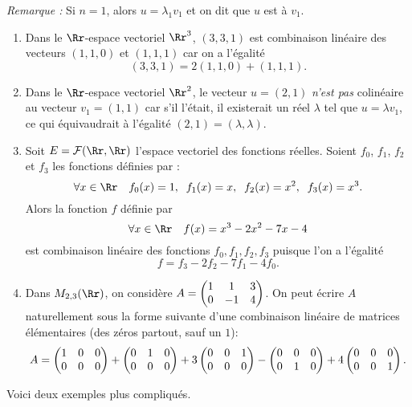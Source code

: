 \documentclass[class=report,crop=false]{standalone}
\begin{document}
\emph{Remarque :} Si $n=1$, alors $u=\lambda_1 v_1$ et on dit que $u$ est  à $v_1$.

\begin{exemple}
\sauteligne
\begin{enumerate}
  \item Dans le $\Rr$-espace vectoriel $\Rr^3$, $(3,3,1)$ est combinaison linéaire des vecteurs
 $(1,1,0)$ et $(1,1,1)$ car on a l'égalité
 $$(3,3,1)=2(1,1,0)+(1,1,1).$$

  \item Dans le $\Rr$-espace vectoriel $\Rr^2$, le vecteur
$u=(2,1)$ \emph{n'est pas} colinéaire au vecteur $v_1=(1,1)$
car s'il l'était, il existerait un réel $\lambda$ tel que $u=\lambda v_1$,
ce qui équivaudrait à l'égalité $(2,1)=(\lambda, \lambda)$.

  \item Soit $E=\mathcal{F}(\Rr, \Rr)$ l'espace vectoriel des fonctions réelles. Soient
 $f_0$, $f_1$, $f_2$ et $f_3$ les fonctions définies par :
 $$\forall x \in \Rr \quad f_0(x)=1, \;\;f_1(x)=x,\;\; f_2(x)=x^2,\;\; f_3(x)=x^3.$$
 Alors la fonction $f$ définie par
 $$\forall x \in \Rr \quad f(x)=x^3-2x ^2-7x-4$$
 est combinaison linéaire des fonctions $f_0, f_1, f_2, f_3$ puisque l'on a l'égalité
 $$f=f_{3}-2f_2-7f_1-4f_0.$$

  \item Dans $M_{2,3}(\Rr)$, on considère
 $A=\begin{pmatrix}
 1&1&3\cr
 0&-1&4
 \end{pmatrix}$. On peut écrire $A$ naturellement sous la forme sui\-vante d'une combinaison linéaire
 de matrices élémentaires (des zéros partout, sauf un $1$):
 $$A=
 \begin{pmatrix}
 1&0&0\cr
 0&0&0
 \end{pmatrix}
 +\begin{pmatrix}
 0&1&0\cr
 0&0&0
 \end{pmatrix}+
 3\begin{pmatrix}
 0&0&1\cr
 0&0&0
 \end{pmatrix}-
 \begin{pmatrix}
 0&0&0\cr
 0&1&0
 \end{pmatrix}
 +4 \begin{pmatrix}
 0&0&0\cr
 0&0&1
 \end{pmatrix}.$$
\end{enumerate}
\end{exemple}

Voici deux exemples plus compliqués.
\end{document}
